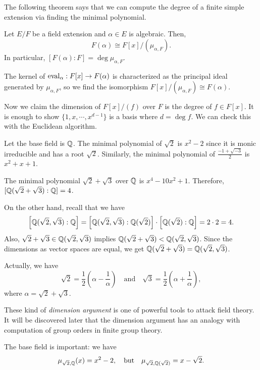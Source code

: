 \documentclass{../exp}
\begin{document}
The following theorem says that we can compute the degree of a finite simple extension via finding the minimal polynomial.
\begin{thm}
Let $E/F$ be a field extension and $\alpha\in E$ is algebraic.
Then,
\[F(\alpha)\cong F[x]/(\mu_{\alpha,F}).\]
In particular, $[F(\alpha):F]=\deg\mu_{\alpha,F}$.
\end{thm}
\begin{pf}
The kernel of $\eval_\alpha:F[x]\to F(\alpha)$ is characterized as the principal ideal generated by $\mu_{\alpha,F}$, so we find the isomorphism $F[x]/(\mu_{\alpha,F})\cong F(\alpha)$.

Now we claim the dimension of $F[x]/(f)$ over $F$ is the degree of $f\in F[x]$.
It is enough to show $\{1,x,\cdots,x^{d-1}\}$ is a basis where $d=\deg f$.
We can check this with the Euclidean algorithm.
\end{pf}


\begin{ex}
Let the base field is $\mathbb{Q}$.
The minimal polynomial of $\sqrt2$ is $x^2-2$ since it is monic irreducible and has a root $\sqrt2$.
Similarly, the minimal polynomial of $\frac{-1+\sqrt{-3}}2$ is $x^2+x+1$.
\end{ex}
\begin{ex}
The minimal polynomial $\sqrt2+\sqrt3$ over $\mathbb{Q}$ is $x^4-10x^2+1$.
Therefore, $[\mathbb{Q}(\sqrt2+\sqrt3):\mathbb{Q}]=4$.

On the other hand, recall that we have
\[\left[\mathbb{Q}(\sqrt2,\sqrt3):\mathbb{Q}\right]=\left[\mathbb{Q}(\sqrt2,\sqrt3):\mathbb{Q}(\sqrt2)\right]\cdot\left[\mathbb{Q}(\sqrt2):\mathbb{Q}\right]=2\cdot2=4.\]
Also, $\sqrt2+\sqrt3\in\mathbb{Q}(\sqrt2,\sqrt3)$ implies $\mathbb{Q}(\sqrt2+\sqrt3)<\mathbb{Q}(\sqrt2,\sqrt3)$.
Since the dimensions as vector spaces are equal, we get $\mathbb{Q}(\sqrt2+\sqrt3)=\mathbb{Q}(\sqrt2,\sqrt3)$.

Actually, we have
\[\sqrt2=\frac12\left(\alpha-\frac1\alpha\right)\quad\text{and}\quad\sqrt3=\frac12\left(\alpha+\frac1\alpha\right),\]
where $\alpha=\sqrt2+\sqrt3$.

These kind of \emph{dimension argument} is one of powerful tools to attack field theory.
It will be discovered later that the dimension argument has an analogy with computation of group orders in finite group theory.
\end{ex}

\begin{ex}
The base field is important: we have
\[\mu_{\sqrt2,\mathbb{Q}}(x)=x^2-2,\quad\text{but}\quad \mu_{\sqrt2,\mathbb{Q}(\sqrt2)}=x-\sqrt2.\]
\end{ex}
\end{document}
